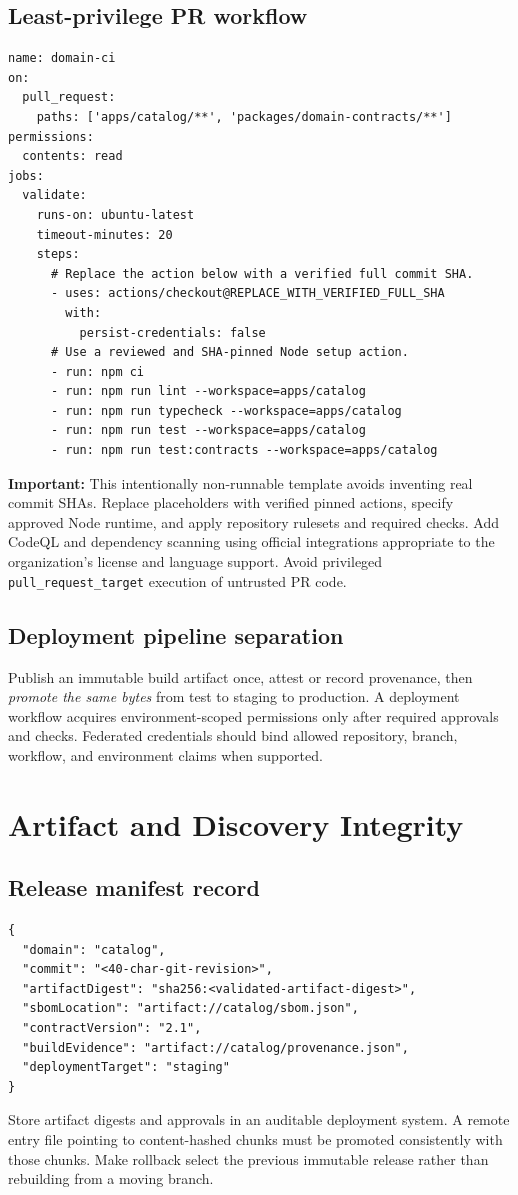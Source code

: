\documentclass[11pt,letterpaper,oneside]{report}
\begin{document}
\section{Least-privilege PR workflow}
\begin{lstlisting}[caption={Workflow skeleton; replace actions with verified full-length commit SHA references}]
name: domain-ci
on:
  pull_request:
    paths: ['apps/catalog/**', 'packages/domain-contracts/**']
permissions:
  contents: read
jobs:
  validate:
    runs-on: ubuntu-latest
    timeout-minutes: 20
    steps:
      # Replace the action below with a verified full commit SHA.
      - uses: actions/checkout@REPLACE_WITH_VERIFIED_FULL_SHA
        with:
          persist-credentials: false
      # Use a reviewed and SHA-pinned Node setup action.
      - run: npm ci
      - run: npm run lint --workspace=apps/catalog
      - run: npm run typecheck --workspace=apps/catalog
      - run: npm run test --workspace=apps/catalog
      - run: npm run test:contracts --workspace=apps/catalog
\end{lstlisting}
\noindent \textbf{Important:} This intentionally non-runnable template avoids inventing real commit SHAs. Replace placeholders with verified pinned actions, specify approved Node runtime, and apply repository rulesets and required checks. Add CodeQL and dependency scanning using official integrations appropriate to the organization's license and language support. Avoid privileged \texttt{pull\_request\_target} execution of untrusted PR code.
\section{Deployment pipeline separation}
Publish an immutable build artifact once, attest or record provenance, then \emph{promote the same bytes} from test to staging to production. A deployment workflow acquires environment-scoped permissions only after required approvals and checks. Federated credentials should bind allowed repository, branch, workflow, and environment claims when supported.
\chapter{Artifact and Discovery Integrity}
\section{Release manifest record}
\begin{lstlisting}[caption={Illustrative artifact record, not an official schema}]
{
  "domain": "catalog",
  "commit": "<40-char-git-revision>",
  "artifactDigest": "sha256:<validated-artifact-digest>",
  "sbomLocation": "artifact://catalog/sbom.json",
  "contractVersion": "2.1",
  "buildEvidence": "artifact://catalog/provenance.json",
  "deploymentTarget": "staging"
}
\end{lstlisting}
Store artifact digests and approvals in an auditable deployment system. A remote entry file pointing to content-hashed chunks must be promoted consistently with those chunks. Make rollback select the previous immutable release rather than rebuilding from a moving branch.
\end{document}
